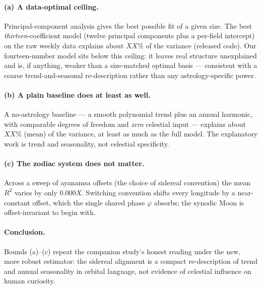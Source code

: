 \documentclass[11pt]{artaquest}
\newcommand{\pcaMean}{XX}              %
\newcommand{\baselineMean}{XX}         %
\newcommand{\zodiacEps}{0.000X}        %
\begin{document}
\paragraph{(a) A data-optimal ceiling.}
Principal-component analysis gives the best possible fit of a given size. The best
\emph{thirteen}-coefficient model (twelve principal components plus a per-field intercept) on the raw
weekly data explains about $\pcaMean\%$ of the variance (released code). Our fourteen-number model sits
below this ceiling: it leaves real structure unexplained and is, if anything, weaker than a size-matched
optimal basis --- consistent with a coarse trend-and-seasonal re-description rather than any
astrology-specific power.

\paragraph{(b) A plain baseline does at least as well.}
A no-astrology baseline --- a smooth polynomial trend plus an annual harmonic, with comparable degrees of
freedom and \emph{zero} celestial input --- explains about $\baselineMean\%$ (mean) of the variance, at
least as much as the full model. The explanatory work is trend and seasonality, not celestial specificity.

\paragraph{(c) The zodiac system does not matter.}
Across a sweep of ayanamsa offsets (the choice of sidereal convention) the mean $R^2$ varies by only
$\zodiacEps$. Switching convention shifts every longitude by a near-constant offset, which the single
shared phase $\varphi$ absorbs; the synodic Moon is offset-invariant to begin with.

\paragraph{Conclusion.}
Bounds (a)--(c) repeat the companion study's honest reading under the new, more robust estimator: the
sidereal alignment is a compact re-description of trend and annual seasonality in orbital language, not
evidence of celestial influence on human curiosity.
\end{document}
